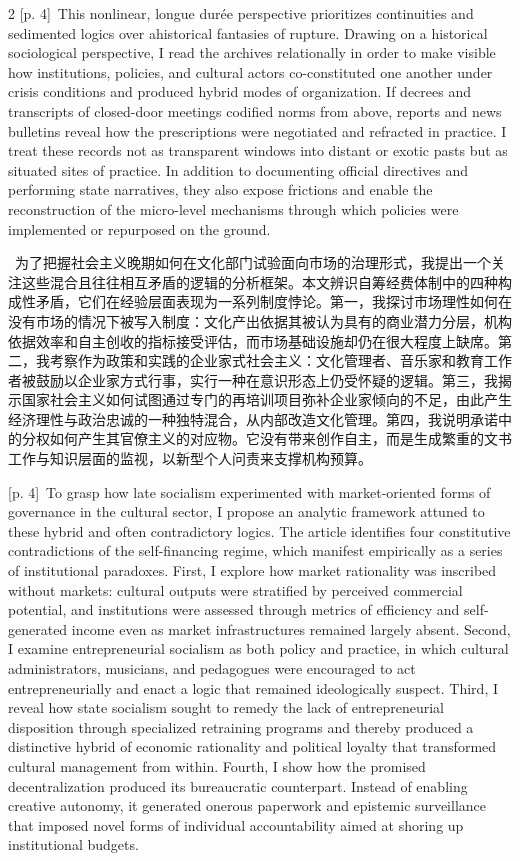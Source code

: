 \documentclass[10pt,a4paper]{article}
\begin{document}
\begin{paracol}{2}
\switchcolumn
{\scriptsize\color{gray} [p. 4]}\ This nonlinear, longue durée perspective prioritizes continuities and sedimented logics over ahistorical fantasies of rupture. Drawing on a historical sociological perspective, I read the archives relationally in order to make visible how institutions, policies, and cultural actors co-constituted one another under crisis conditions and produced hybrid modes of organization. If decrees and transcripts of closed-door meetings codified norms from above, reports and news bulletins reveal how the prescriptions were negotiated and refracted in practice. I treat these records not as transparent windows into distant or exotic pasts but as situated sites of practice. In addition to documenting official directives and performing state narratives, they also expose frictions and enable the reconstruction of the micro-level mechanisms through which policies were implemented or repurposed on the ground.\par
\switchcolumn*
{\scriptsize\color{gray} [p. 4]}\ 为了把握社会主义晚期如何在文化部门试验面向市场的治理形式，我提出一个关注这些混合且往往相互矛盾的逻辑的分析框架。本文辨识自筹经费体制中的四种构成性矛盾，它们在经验层面表现为一系列制度悖论。第一，我探讨市场理性如何在没有市场的情况下被写入制度：文化产出依据其被认为具有的商业潜力分层，机构依据效率和自主创收的指标接受评估，而市场基础设施却仍在很大程度上缺席。第二，我考察作为政策和实践的企业家式社会主义：文化管理者、音乐家和教育工作者被鼓励以企业家方式行事，实行一种在意识形态上仍受怀疑的逻辑。第三，我揭示国家社会主义如何试图通过专门的再培训项目弥补企业家倾向的不足，由此产生经济理性与政治忠诚的一种独特混合，从内部改造文化管理。第四，我说明承诺中的分权如何产生其官僚主义的对应物。它没有带来创作自主，而是生成繁重的文书工作与知识层面的监视，以新型个人问责来支撑机构预算。\par
\switchcolumn
{\scriptsize\color{gray} [p. 4]}\ To grasp how late socialism experimented with market-oriented forms of governance in the cultural sector, I propose an analytic framework attuned to these hybrid and often contradictory logics. The article identifies four constitutive contradictions of the self-financing regime, which manifest empirically as a series of institutional paradoxes. First, I explore how market rationality was inscribed without markets: cultural outputs were stratified by perceived commercial potential, and institutions were assessed through metrics of efficiency and self-generated income even as market infrastructures remained largely absent. Second, I examine entrepreneurial socialism as both policy and practice, in which cultural administrators, musicians, and pedagogues were encouraged to act entrepreneurially and enact a logic that remained ideologically suspect. Third, I reveal how state socialism sought to remedy the lack of entrepreneurial disposition through specialized retraining programs and thereby produced a distinctive hybrid of economic rationality and political loyalty that transformed cultural management from within. Fourth, I show how the promised decentralization produced its bureaucratic counterpart. Instead of enabling creative autonomy, it generated onerous paperwork and epistemic surveillance that imposed novel forms of individual accountability aimed at shoring up institutional budgets.\par

\end{paracol}
\end{document}
